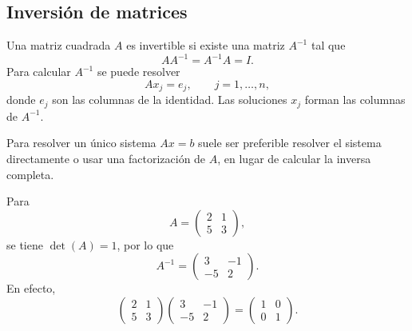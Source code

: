 \documentclass[a4,11pt]{aleph-notas}
\begin{document}
\subsection{Inversión de matrices}

\begin{defi}
    Una matriz cuadrada $A$ es invertible si existe una matriz $A^{-1}$ tal que
    \[
        AA^{-1}=A^{-1}A=I.
    \]
    Para calcular $A^{-1}$ se puede resolver
    \[
        A{x}_j={e}_j,
        \qquad j=1,\ldots,n,
    \]
    donde ${e}_j$ son las columnas de la identidad. Las soluciones ${x}_j$ forman las columnas de $A^{-1}$.
\end{defi}

\begin{advertencia}
    Para resolver un único sistema $A{x}={b}$ suele ser preferible resolver el sistema directamente o usar una factorización de $A$, en lugar de calcular la inversa completa.
\end{advertencia}

\begin{ejem}
    Para
    \[
        A=
        \begin{pmatrix}
            2 & 1\\
            5 & 3
        \end{pmatrix},
    \]
    se tiene $\det(A)=1$, por lo que
    \[
        A^{-1}=
        \begin{pmatrix}
            3 & -1\\
            -5 & 2
        \end{pmatrix}.
    \]
    En efecto,
    \[
        \begin{pmatrix}
            2 & 1\\
            5 & 3
        \end{pmatrix}
        \begin{pmatrix}
            3 & -1\\
            -5 & 2
        \end{pmatrix}
        =
        \begin{pmatrix}
            1 & 0\\
            0 & 1
        \end{pmatrix}.
    \]
\end{ejem}
\end{document}
